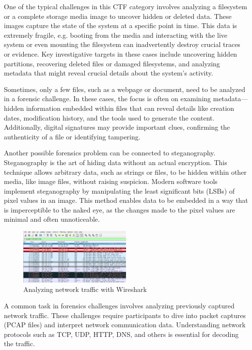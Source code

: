 \documentclass[conference]{IEEEtran}
\begin{document}
One of the typical challenges in this CTF category involves analyzing a
filesystem or a complete storage media image to uncover hidden or deleted data.
These images capture the state of the system at a specific point in time.
This data is extremely
fragile, e.g. booting from the media and interacting with the live system or
even mounting the filesystem can inadvertently destroy crucial
traces or evidence.
Key investigative targets in these cases include uncovering hidden partitions,
recovering deleted files or damaged filesystems, and analyzing metadata that might reveal crucial
details about the system's activity.

Sometimes, only a few files, such as a webpage or document, need to be analyzed
in a forensic challenge. In these cases, the focus is often on examining
metadata—hidden information embedded within files that can reveal details like
creation dates, modification history, and the tools used to generate the
content. Additionally, digital signatures may provide important clues,
confirming the authenticity of a file or identifying tampering.

Another possible forensics problem can be connected to steganography.
Steganography is the art of hiding data without an actual encryption.
This technique allows arbitrary data, such as strings or files, to be hidden
within other media, like image files, without raising suspicion.
Modern software tools implement steganography by manipulating the least
significant bits (LSBs) of pixel values in an image. This method enables data
to be embedded in a way that is imperceptible to the naked eye, as the changes
made to the pixel values are minimal and often unnoticeable.
\cite{morkel2005}

\begin{figure}[htbp]
	\centering
	\includegraphics[width=0.5\textwidth]{fig/wireshark.png}
	\caption{Analyzing network traffic with Wireshark}
	\label{fig-wireshark}
\end{figure}

A common task in forensics challenges involves analyzing previously captured
network traffic. These challenges require participants to dive into packet
captures (PCAP files) and interpret network communication data.
Understanding network
protocols such as TCP, UDP, HTTP, DNS, and others is essential for decoding the
traffic.
\end{document}
